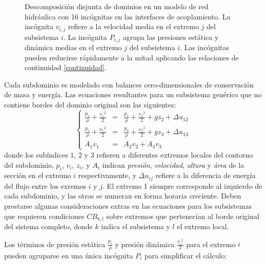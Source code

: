 \begin{figure}[ht]
\caption[Descomposición disjunta de dominios en el modelado de redes hidráulicas]
{Descomposición disjunta de dominios en un modelo de red hidráulica con 16 incógnitas en las interfaces de acoplamiento.
La incógnita $v_{i,j}$ refiere a la velocidad media en el extremo $j$ del subsistema $i$.
La incógnita $P_{i,j}$ agrupa las presiones estática y dinámica medias en el extremo $j$ del subsistema $i$.
Las incógnitas pueden reducirse rápidamente a la mitad aplicando las relaciones de continuidad \ref{continuidad}.}
\label{net16}
\end{figure}

Cada subdominio es modelado con balances cero-dimensionales de conservación de masa y energía.
Las ecuaciones resultantes para un subsistema genérico que no contiene bordes del dominio original son las siguientes:
\begin{equation}
\left \{
\begin{array}{rcl}
\frac{p_1}{\rho} + \frac{{v_1}^2}{2} &=& \frac{p_2}{\rho} + \frac{{v_2}^2}{2} + gz_2 + \Delta u_{12} \\
\frac{p_1}{\rho} + \frac{{v_1}^2}{2} &=& \frac{p_3}{\rho} + \frac{{v_3}^2}{2} + gz_3 + \Delta u_{13} \\
A_1 v_1 &=& A_2 v_2 + A_3 v_3
\end{array}
\right .
\label{net-eq}
\end{equation}
donde los subíndices $1$, $2$ y $3$ refieren a diferentes extremos locales del contorno del subdominio,
$p_i$, $v_i$, $z_i$, y $A_i$ indican \textit{presión}, \textit{velocidad}, \textit{altura} y \textit{área} de la sección en el extremo $i$ respectivamente,
y $\Delta u_{ij}$ refiere a la diferencia de energía del flujo entre los exremos $i$ y $j$.
El extremo 1 siempre corresponde al izquierdo de cada subdominio, y las otros se numeran en forma horaria creciente.
Deben prestarse algunas consideraciones extras en las ecuaciones para los subsistemas que requieren condiciones $CB_{k,l}$ sobre extremos que pertenecían al borde original del sistema completo,
donde $k$ indica el subsistema y $l$ el extremo local.

Los términos de presión estática $\frac{p_i}{\rho}$ y presión dinámica $\frac{{v_i}^2}{2}$ para el extremo $i$ pueden agruparse en una única incógnita $P_i$ para simplificar el cálculo:

